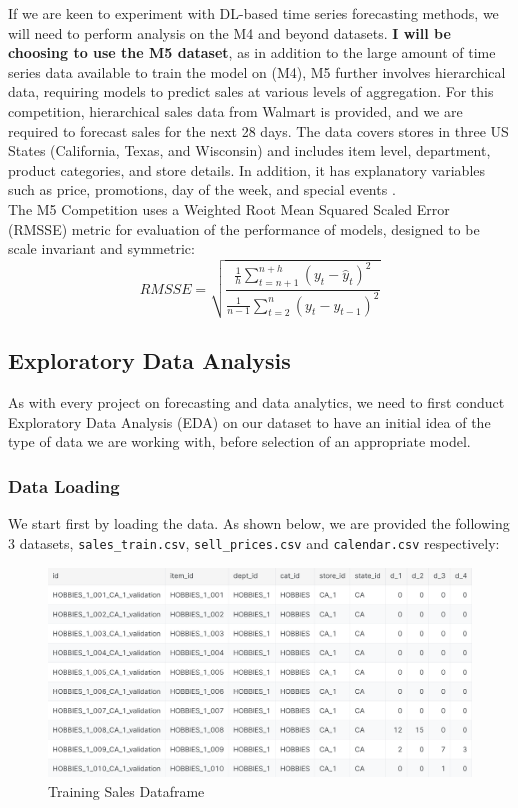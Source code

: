 \documentclass[12pt]{article}
\begin{document}
If we are keen to experiment with DL-based time series forecasting methods, we will need to perform analysis on the M4 and beyond datasets. \textbf{I will be choosing to use the M5 dataset}, as in addition to the large amount of time series data available to train the model on (M4), M5 further involves hierarchical data, requiring models to predict sales at various levels of aggregation. For this competition, hierarchical sales data from Walmart is provided, and we are required to forecast sales for the next 28 days. The data covers stores in three US States (California, Texas, and Wisconsin) and includes item level, department, product categories, and store details. In addition, it has explanatory variables such as price, promotions, day of the week, and special events \cite{m5-forecasting-accuracy}. \\ 

\noindent The M5 Competition uses a Weighted Root Mean Squared Scaled Error (RMSSE) metric for evaluation of the performance of models, designed to be scale invariant and symmetric: \begin{equation}
    RMSSE = \sqrt{ \frac{\frac{1}{h} \sum_{t=n+1}^{n+h} (y_{t}-\hat{y}_t)^{2}}{\frac{1}{n-1} \sum_{t=2}^{n}(y_{t}-y_{t-1})^{2}}}
\end{equation}

\subsection*{Exploratory Data Analysis}

As with every project on forecasting and data analytics, we need to first conduct Exploratory Data Analysis (EDA) on our dataset to have an initial idea of the type of data we are working with, before selection of an appropriate model. 

\subsubsection*{Data Loading}

We start first by loading the data. As shown below, we are provided the following 3 datasets, \verb|sales_train.csv|, \verb|sell_prices.csv| and \verb|calendar.csv| respectively: 

\begin{figure}[H]
    \centering
    \includegraphics[width=\textwidth]{Images/trainingsalesdata.png}
    \caption{Training Sales Dataframe}
    \label{fig:6-trainingsales}
\end{figure} 
\end{document}
